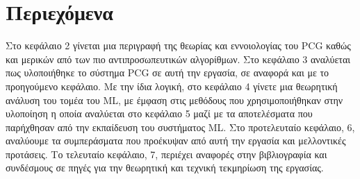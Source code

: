\section{Περιεχόμενα}
Στο κεφάλαιο 2 γίνεται μια περιγραφή της θεωρίας και εννοιολογίας του PCG καθώς και μερικών από των πιο αντιπροσωπευτικών αλγορίθμων. Στο κεφάλαιο 3 αναλύεται πως υλοποιήθηκε το σύστημα PCG σε αυτή την εργασία, σε αναφορά και με το προηγούμενο κεφάλαιο. Με την ίδια λογική, στο κεφάλαιο 4 γίνετε μια θεωρητική ανάλυση του τομέα του ML, με έμφαση στις μεθόδους που χρησιμοποιήθηκαν στην υλοποίηση η οποία αναλύεται στο κεφάλαιο 5 μαζί με τα αποτελέσματα που παρήχθησαν από την εκπαίδευση του συστήματος ML. Στο προτελευταίο κεφάλαιο, 6, αναλύουμε τα συμπεράσματα που προέκυψαν από αυτή την εργασία και μελλοντικές προτάσεις. Το τελευταίο κεφάλαιο, 7, περιέχει αναφορές στην βιβλιογραφία και συνδέσμους σε πηγές για την θεωρητική και τεχνική τεκμηρίωση της εργασίας.




